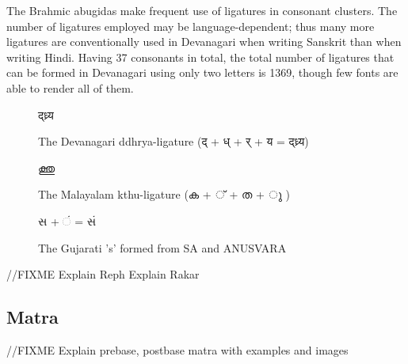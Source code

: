 The Brahmic abugidas make frequent use of ligatures in consonant clusters. The number of ligatures employed may be language-dependent; thus many more ligatures are conventionally used in Devanagari when writing Sanskrit than when writing Hindi. Having 37 consonants in total, the total number of ligatures that can be formed in Devanagari using only two letters is 1369, though few fonts are able to render all of them.

\begin{figure}[h]
   \centering
   {\hindi\textexample द्ध्र्य }
   \caption{The Devanagari ddhrya-ligature {\hindi (द् + ध् + र् + य = द्ध्र्य) } }
\end{figure}

\begin{figure}[h]
   \centering
   {\malayalam\textexample  ക്തു}
   \caption{The Malayalam kthu-ligature {\malayalam (ക + ് + ത + ു ) } }
\end{figure}

\begin{figure}[h]
  \centering
  {\gujarati\textexample સ +  ં = સં}
  \caption{The Gujarati 's' formed from SA and ANUSVARA}
\end{figure}



//FIXME
Explain Reph
Explain Rakar

\subsection*{Matra}
//FIXME
Explain prebase, postbase matra with examples and images






